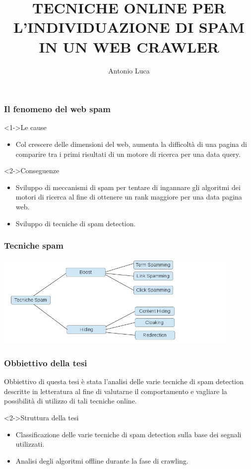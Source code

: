\documentclass{beamer}
\title[Tesi di Laurea]{TECNICHE ONLINE PER L’INDIVIDUAZIONE DI SPAM IN UN WEB CRAWLER}
\institute{Università degli Studi di Milano}
\author{Antonio Luca}
\begin{document}
\begin{frame}
  \maketitle
\end{frame}
\begin{frame}
    \frametitle{Il fenomeno del web spam}
    \begin{block}<1->{Le cause}
    \begin{itemize}
    \item<1->Col crescere delle dimensioni del web, aumenta la difficoltà di una pagina di comparire tra i primi risultati di un motore di ricerca per una data query.
    \end{itemize}
    \end{block}
    \begin{block}<2->{Conseguenze}
    \begin{itemize}
        \item<1->Sviluppo di meccanismi di spam per tentare di ingannare gli algoritmi dei motori di ricerca al fine di ottenere un rank maggiore per una data pagina web. 
        \item<2->Sviluppo di tecniche di spam detection.
    \end{itemize}
    \end{block}
\end{frame}
 \begin{frame}
     \frametitle{Tecniche spam}
     \begin{center}
      \includegraphics[width=12cm]{immagini/spam}
     \end{center}
 \end{frame}
\begin{frame}
  \frametitle{Obbiettivo della tesi}  
  Obbiettivo di questa tesi è stata l’analisi delle varie tecniche di spam detection descritte in letteratura al fine di valutarne il comportamento e vagliare la possibilità di utilizzo di tali tecniche online.
  \begin{block}<2->{Struttura della tesi}
  \begin{itemize}
  \item Classificazione delle varie tecniche di spam detection sulla base dei segnali utilizzati.
  \item Analisi degli algoritmi offline durante la fase di crawling.
  \end{itemize}
  \end{block}
\end{frame}
\end{document}
